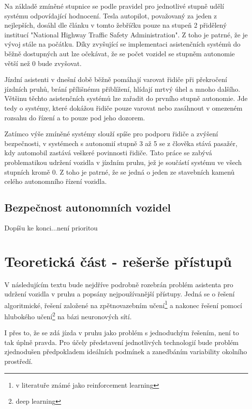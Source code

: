 \documentclass[czech, bc, kky, he, iso690alph]{fasthesis}
\begin{document}
       	Na základě zmíněné stupnice se podle pravidel pro jednotlivé stupně udělí systému odpovídající hodnocení. Tesla autopilot, považovaný za jeden z nejlepších, dosáhl dle článku \cite{autopilot} v tomto žebříčku pouze na stupeň 2 přidělený institucí "National Highway Traffic Safety Administration". Z toho je patrné, že je vývoj stále na počátku. Díky zvyšující se implementaci asistenčních systémů do běžně dostupných aut lze očekávat, že se počet vozidel se stupněm autonomie větší než 0 bude zvyšovat.         
        
        Jízdní asistenti v dnešní době běžně pomáhají varovat řidiče při překročení jízdních pruhů, brání přílišnému přiblížení, hlídají mrtvý úhel a mnoho dalšího. Většinu těchto asistenčních systémů lze zařadit do prvního stupně autonomie. Jde tedy o systémy, které dokážou řidiče pouze varovat nebo zasáhnout v omezeném rozsahu do řízení a to pouze pod jeho dozorem.
        
        Zatímco výše zmíněné systémy slouží spíše pro podporu řidiče a zvýšení bezpečnosti, v systémech s autonomií stupně 3 až 5 se z člověka stává pasažér, kdy automobil zastává veškeré povinnosti řidiče. Tato práce se zabývá problematikou udržení vozidla v jízdním pruhu, jež je součástí systému ve všech stupních kromě 0. Z toho je patrné, že se jedná o jeden ze stavebních kamenů celého autonomního řízení vozidla.\\
    \section{Bezpečnost autonomních vozidel}
    	Dopíšu ke konci...není prioritou
    \chapter{Teoretická část - rešerše přístupů}\label{chap:01_asisten_jizdy_v_pruhu}
	    V následujícím textu bude nejdříve podrobně rozebrán problém asistenta pro udržení vozidla v pruhu a popsány nejpoužívanější přístupy. Jedná se o řešení algoritmické, řešení založené na zpětnovazebním učení\footnote{v literatuře známé jako reinforcement learning} a nakonec řešení pomocí hlubokého učení\footnote{deep learning} na bázi neuronových sítí.
	    
        I přes to, že se zdá jízda v pruhu jako problém s jednoduchým řešením, není to tak úplně pravda. Pro účely představení jednotlivých technologií bude problém zjednodušen předpokladem ideálních podmínek a zanedbáním variability okolního prostředí.
        
\end{document}
